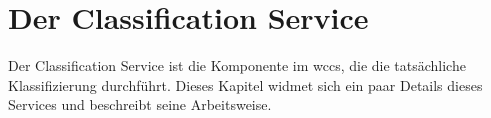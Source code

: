 \section{Der Classification Service}
    \label{section:solutionDetailsClassificationService}
    Der Classification Service ist die Komponente im \gls{wccs},
    die die tatsächliche Klassifizierung durchführt.
    Dieses Kapitel widmet sich ein paar Details dieses Services
    und beschreibt seine Arbeitsweise.

    
    
    
    
